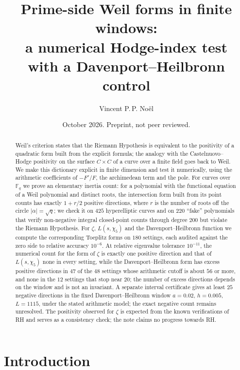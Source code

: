 \documentclass[11pt]{amsart}
\title[Prime-side Weil forms with a Davenport--Heilbronn control]{Prime-side Weil forms in finite windows: \\ a numerical Hodge-index test \\ with a Davenport--Heilbronn control}
\author{Vincent P.\,P. No\"el}
\date{October 2026. Preprint, not peer reviewed.}
\theoremstyle{remark}
\theoremstyle{definition}
\newcommand{\F}{\mathbb F}
\begin{document}
\begin{abstract}
Weil's criterion states that the Riemann Hypothesis is equivalent to the positivity of a quadratic form built from the explicit formula; the analogy with the Castelnuovo--Hodge positivity on the surface $C\times C$ of a curve over a finite field goes back to Weil. We make this dictionary explicit in finite dimension and test it numerically, using the arithmetic coefficients of $-F'/F$, the archimedean term and the pole. For curves over $\F_q$ we prove an elementary inertia count: for a polynomial with the functional equation of a Weil polynomial and distinct roots, the intersection form built from its point counts has exactly $1+r/2$ positive directions, where $r$ is the number of roots off the circle $|\alpha|=\sqrt q$; we check it on $425$ hyperelliptic curves and on $220$ ``fake'' polynomials that verify non-negative integral closed-point counts through degree $200$ but violate the Riemann Hypothesis. For $\zeta$, $L(s,\chi_5)$ and the Davenport--Heilbronn function we compute the corresponding Toeplitz forms on $180$ settings, each audited against the zero side to relative accuracy $10^{-6}$. At relative eigenvalue tolerance $10^{-11}$, the numerical count for the form of $\zeta$ is exactly one positive direction and that of $L(s,\chi_5)$ none in every setting, while the Davenport--Heilbronn form has excess positive directions in $47$ of the $48$ settings whose arithmetic cutoff is about $56$ or more, and none in the $12$ settings that stop near $20$; the number of excess directions depends on the window and is not an invariant. A separate interval certificate gives at least $25$ negative directions in the fixed Davenport--Heilbronn window $a=0.02$, $h=0.005$, $L=1115$, under the stated arithmetic model; the exact negative count remains unresolved. The positivity observed for $\zeta$ is expected from the known verifications of RH and serves as a consistency check; the note claims no progress towards RH.
\end{abstract}

\maketitle

\section{Introduction}
\end{document}
